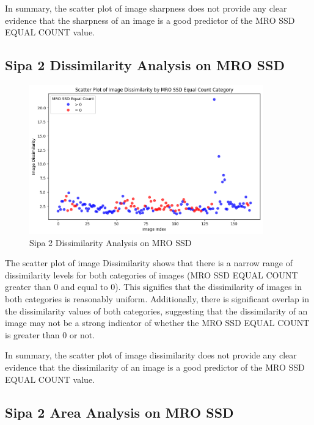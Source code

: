 In summary, the scatter plot of image sharpness does not provide any clear evidence that the sharpness of an image is a good predictor of the MRO SSD EQUAL COUNT value.

\newpage


\subsection{Sipa 2 Dissimilarity Analysis on MRO SSD}


\begin{figure}[ht]
    \centering
    \includegraphics[width=0.9\textwidth]{Figures/Results/sipa_02/dissimilarity.png}
    \caption[Sipa 2 Dissimilarity Analysis on MRO SSD]{Sipa 2 Dissimilarity Analysis on MRO SSD}
    \label{fig:Sipa 2 Dissimilarity Analysis on MRO SSD}
\end{figure}



The scatter plot of image Dissimilarity shows that there is a narrow range of dissimilarity levels for both categories of images (MRO SSD EQUAL COUNT greater than 0 and equal to 0). This signifies that the dissimilarity of images in both categories is reasonably uniform. Additionally, there is significant overlap in the dissimilarity values of both categories, suggesting that the dissimilarity of an image may not be a strong indicator of whether the MRO SSD EQUAL COUNT is greater than 0 or not.

In summary, the scatter plot of image dissimilarity does not provide any clear evidence that the dissimilarity of an image is a good predictor of the MRO SSD EQUAL COUNT value.


\newpage

\subsection{Sipa 2 Area Analysis on MRO SSD}


